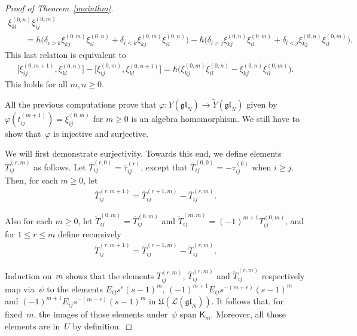 \documentclass[11pt]{article}
\numberwithin{theorem}{section}
\numberwithin{proposition}{section}
\numberwithin{lemma}{section}
\numberwithin{corollary}{section}
\numberwithin{definition}{section}
\numberwithin{example}{section}
\numberwithin{remark}{section}
\numberwithin{note}{section}
\numberwithin{equation}{section}
\begin{document}
\begin{proof}[Proof of Theorem~\ref{mainthm}]
\begin{gather*}
\xi_{kl}^{(0,n)} \xi_{ij}^{(0,m)}
\\
\qquad
= \hbar \big(\delta_{i>k} \xi_{kj}^{(0,m)} \xi_{il}^{(0,n)}+ \delta_{i<k} \xi_{kj}^{(0,m)} \xi_{il}^{(0,n)}\big)
  - \hbar \big(\delta_{l>j} \xi_{kj}^{(0,n)} \xi_{il}^{(0,m)} + \delta_{l<j} \xi_{kj}^{(0,n)} \xi_{il}^{(0,m)}\big).
\end{gather*}
This last relation is equivalent to
\begin{gather*}
\big[\xi_{ij}^{(0,m+1)}, \xi_{kl}^{(0,n)}\big] - \big[\xi_{ij}^{(0,m)}, \xi_{kl}^{(0,n+1)}\big] = \hbar \big(\xi_{kj}^{(0,m)}
\xi_{il}^{(0,n)} - \xi_{kj}^{(0,n)} \xi_{il}^{(0,m)}\big).
\end{gather*}
This holds for all $m,n\ge 0$.

All the previous computations prove that $\varphi\colon Y(\mathfrak{gl}_N) \longrightarrow
\widetilde{Y}(\mathfrak{gl}_N)$ given by $\varphi(t_{ij}^{(m+1)}) = \xi_{ij}^{(0,m)}$ for $m\ge 0$ is an
algebra homomorphism.
We still have to show that~$\varphi$ is injective and surjective.

We will f\/irst demonstrate surjectivity.
Towards this end, we def\/ine elements $\overline{T}_{ij}^{(r,m)}$ as follows.
Let $\overline{T}_{ij}^{(r,0)}=\overline{\tau}_{ij}^{(r)}$, except that $\overline{T}_{ij}^{(0,0)}=-\tau_{ij}^{(0)}$
when $i \geq j$.
Then, for each $m \geq 0$, let
\begin{gather*}
\overline{T}_{ij}^{(r,m+1)}=\overline{T}_{ij}^{(r+1,m)}-\overline{T}_{ij}^{(r,m)}.
\end{gather*}

Also for each $m \geq 0$, let $\widetilde{T}_{ij}^{(0,m)}=\overline{T}_{ij}^{(0,m)}$ and
$\widetilde{T}_{ij}^{(m,m)}=(-1)^{m+1}T_{ij}^{(0,m)}$, and for $1 \leq r \leq m$ def\/ine recursively
\begin{gather*}
\widetilde{T}_{ij}^{(r,m+1)}=\widetilde{T}_{ij}^{(r-1,m)}-\widetilde{T}_{ij}^{(r,m)}.
\end{gather*}


Induction on~$m$ shows that the elements $T_{ij}^{(r,m)}$, $\overline{T}_{ij}^{(r,m)}$ and $\widetilde{T}_{ij}^{(r,m)}$
respectively map via~$\psi$ to the elements $E_{ij}s^r(s-1)^m$, $(-1)^{m+1}E_{ij}s^{-(m+r)}(s-1)^m$ and
$(-1)^{m+1}E_{ij}s^{-(m-r)}(s-1)^m$ in $\mathfrak{U}(\mathcal{L}(\mathfrak{gl}_N))$.
It follows that, for f\/ixed~$m$, the images of those elements under~$\psi$ span $\mathsf{K}_m$.
Moreover, all those elements are in~$U$ by def\/inition.


\end{proof}
\end{document}
